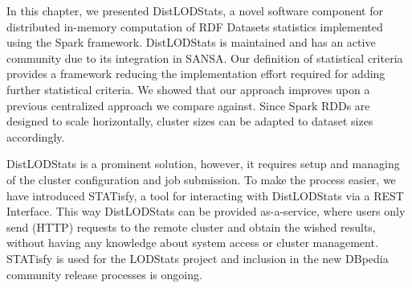 In this chapter, we presented DistLODStats, a novel software component for distributed in-memory computation of \gls{RDF} Datasets statistics implemented using the Spark framework.
DistLODStats is maintained and has an active community due to its integration in SANSA. 
Our definition of statistical criteria provides a framework reducing the implementation effort required for adding further statistical criteria. 
We showed that our approach improves upon a previous centralized approach we compare against.
Since Spark \gls{RDD}s are designed to scale horizontally, cluster sizes can be adapted to dataset sizes accordingly. 

DistLODStats is a prominent solution, however, it requires setup and managing of the cluster configuration and job submission.
To make the process easier, we have introduced STATisfy, a tool for interacting with DistLODStats via a REST Interface.
This way DistLODStats can be provided as-a-service, where users only send (HTTP) requests to the remote cluster and obtain the wished results, without having any knowledge about system access or cluster management.
STATisfy is used for the LODStats project and inclusion in the new DBpedia community release processes is ongoing.